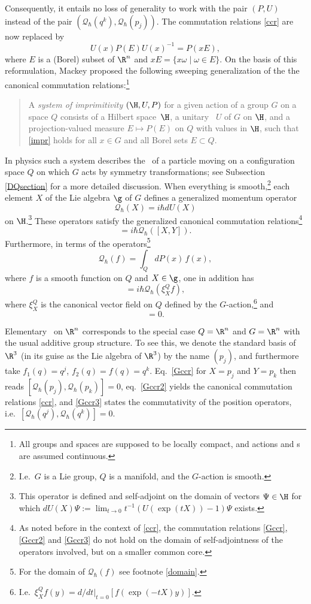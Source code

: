 \documentclass[12pt,titlepage]{article}
\newcommand{\beq}{\begin{equation}}
\newcommand{\eeq}{\end{equation}}
\newcommand{\Hs}{Hilbert space} \newcommand{\Bs}{Banach space}
\newcommand{\raw}{\rightarrow} \newcommand{\rat}{\mapsto}
\newcommand{\qh}{q_{\hbar}} \newcommand{\sgh}{\sigma_{\hbar}}
\newcommand{\inv}{^{-1}} \newcommand{\sa}{_{\R}}
\newcommand{\er}{\eqref}
\newcommand{\om}{\omega} \newcommand{\Om}{\Omega}
\newcommand{\CQ}{{\mathcal Q}} \newcommand{\CR}{{\mathcal R}}
\renewcommand{\qh}{\CQ_{\hbar}}
\begin{document}
 Consequently, it entails no loss of generality to work with the pair $(P,U)$ instead of the   pair $(\qh(q^k),\qh(p_j))$. The commutation relations \er{ccr} are now replaced by 
\beq U(x)P(E)U(x)\inv=P(xE), \label{impr}\eeq
where $E$ is a (Borel) subset of $\R^n$ and $xE=\{x\om\mid\om\in E\}$. On the basis of this reformulation, Mackey proposed  the following sweeping generalization of the the canonical commutation relations:\footnote{All groups and spaces are supposed to be locally compact, and actions and \rep s are assumed continuous.} 
\begin{quote}A {\it system of imprimitivity} $(\H,U,P)$ for
a given action of a group $G$  on a space $Q$  consists of a \Hs\ $\H$, a unitary \rep\ $U$ of $G$ on $\H$, and a projection-valued measure $E\mapsto P(E)$ on $Q$ with values in $\H$, such that  \er{impr} holds for all $x\in G$ and all Borel sets $E\subset Q$.
\end{quote}

In physics such a system describes the \qm\ of a particle moving on a configuration space $Q$ on which $G$ acts by symmetry transformations; see Subsection \ref{DQsection} for a more detailed discussion. When everything is smooth,\footnote{I.e.\ $G$ is a Lie group, $Q$ is a manifold, and the $G$-action is smooth.}  each element $X$ of the Lie algebra $\g$ of $G$ defines a generalized momentum operator \beq
\qh(X)=i\hbar dU(X)\label{mom}\eeq on $\H$.\footnote{This operator is defined and self-adjoint on the domain of vectors $\Psi\in \H$ for which $dU(X)\Psi:=\lim_{t\raw 0} t\inv(U(\exp(tX))-1)\Psi$ exists.\label{dUFN}}  These operators satisfy the generalized canonical commutation relations\footnote{As noted before in the context of \er{ccr}, the  commutation relations \er{Gccr},
\er{Gccr2} and \er{Gccr3}  do not hold on the domain of self-adjointness of the operators involved, but on a smaller common core.}
\beq [\qh(X),\qh(Y)] = i\hbar \qh([X,Y]). \label{Gccr}\eeq Furthermore, in terms of the operators\footnote{For the domain of $\qh(f)$ see footnote  \ref{domain}.} 
\beq \qh(f)=\int_Q dP(x)\, f(x), \label{pifP}\eeq where $f$ is a smooth function on $Q$ and $X\in\g$, 
one in addition has 
\beq [\qh(X),\qh(f)] =i\hbar\qh(\xi^Q_X f), \label{Gccr2}\eeq
where $\xi^Q_X$ is the canonical  vector field on $Q$ defined by the $G$-action,\footnote{I.e.\ $\xi^Q_X f(y)=d/dt|_{t=0} [f(\exp(-tX)y)]$.\label{VFFN}}
 and \beq [\qh(f_1),\qh(f_2)]=0. \label{Gccr3}\eeq

Elementary \qm\ on $\R^n$ corresponds to the special case $Q=\R^n$
and $G=\R^n$ with the usual additive group structure. To see this,
we denote  the standard basis  of $\R^3$ (in its guise as the Lie algebra of $\R^3$)  by the name $(p_j)$, and furthermore take $f_1(q)=q^j$, 
$f_2(q)=f(q)=q^k$. Eq.\ \er{Gccr} for $X=p_j$ and $Y=p_k$ then reads $[\qh(p_j),\qh(p_k)]=0$, eq.\ \er{Gccr2} yields the canonical commutation relations \er{ccr}, and \er{Gccr3} states the commutativity of the position operators, i.e.\  $[\qh(q^j),\qh(q^k)]=0$.
\end{document}
